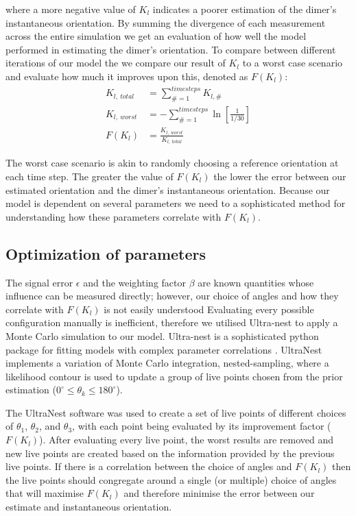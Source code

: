 \documentclass[final, 3p]{elsarticle}
\begin{document}
where a more negative value of $K_l$ indicates a poorer estimation of
the dimer's instantaneous orientation.  By summing the divergence of
each measurement across the entire simulation we get an evaluation of
how well the model performed in estimating the dimer's orientation.
To compare between different iterations of our model the we compare
our result of $K_l$ to a worst case scenario and evaluate how much it
improves upon this, denoted as $F(K_l)$:
\begin{align}
K_{l, \ total} &= \sum\limits_{\# =1}^{timesteps} K_{l,\#} \\
K_{l, \ worst} &= -\sum\limits_{\#=1}^{timesteps} \ln \left[\frac{1}{1/30} \right] \\
F(K_l) &= \frac{K_{l,\ worst}}{K_{l, \ total}}
\end{align}

The worst case scenario is akin to randomly choosing a reference
orientation at each time step. The greater the value of $F(K_l)$ the
lower the error between our estimated orientation and the dimer's
instantaneous orientation. Because our model is dependent on several
parameters we need to a sophisticated method for understanding how
these parameters correlate with $F(K_l)$.


\subsection{Optimization of parameters}
\label{sec:2.4}

The signal error $\epsilon$ and the weighting factor $\beta$ are known
quantities whose influence can be measured directly; however, our
choice of angles and how they correlate with $F(K_l)$ is not easily
understood Evaluating every possible configuration manually is
inefficient, therefore we utilised Ultra-nest to apply a Monte Carlo
simulation to our model. Ultra-nest is a sophisticated python package
for fitting models with complex parameter correlations
\cite{Buchner2016Ultranest}.  UltraNest implements a variation of
Monte Carlo integration, nested-sampling, where a likelihood contour
is used to update a group of live points chosen from the prior
estimation ($0^{\circ} \leq \theta_k \leq 180^{\circ}$).

The UltraNest software was used to create a set of live points of
different choices of $\theta_1$, $\theta_2$, and $\theta_3$, with each
point being evaluated by its improvement factor ($F(K_l)$).  After
evaluating every live point, the worst results are removed and new
live points are created based on the information provided by the
previous live points.  If there is a correlation between the choice of
angles and $F(K_l)$ then the live points should congregate around a
single (or multiple) choice of angles that will maximise $F(K_l)$ and
therefore minimise the error between our estimate and instantaneous
orientation.
\end{document}
